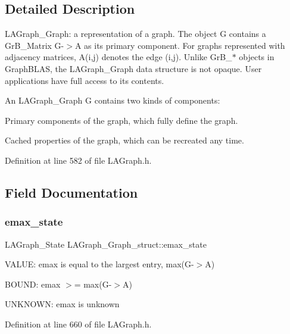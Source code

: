 \subsection{Detailed Description}
L\+A\+Graph\+\_\+\+Graph\+: a representation of a graph. The object G contains a Gr\+B\+\_\+\+Matrix G-\/$>$A as its primary component. For graphs represented with adjacency matrices, A(i,j) denotes the edge (i,j). Unlike Gr\+B\+\_\+$\ast$ objects in Graph\+B\+L\+AS, the L\+A\+Graph\+\_\+\+Graph data structure is not opaque. User applications have full access to its contents.

An L\+A\+Graph\+\_\+\+Graph G contains two kinds of components\+:
\begin{DoxyEnumerate}
\item Primary components of the graph, which fully define the graph.
\item Cached properties of the graph, which can be recreated any time. 
\end{DoxyEnumerate}

Definition at line 582 of file L\+A\+Graph.\+h.



\subsection{Field Documentation}
\mbox{\label{structLAGraph__Graph__struct_ad7bf05c8e88d308e233428d059c52111}} 
\subsubsection{\texorpdfstring{emax\+\_\+state}{emax\_state}}
{\footnotesize\ttfamily L\+A\+Graph\+\_\+\+State L\+A\+Graph\+\_\+\+Graph\+\_\+struct\+::emax\+\_\+state}


\begin{DoxyItemize}
\item V\+A\+L\+UE\+: emax is equal to the largest entry, max(G-\/$>$A)
\item B\+O\+U\+ND\+: emax $>$= max(G-\/$>$A)
\item U\+N\+K\+N\+O\+WN\+: emax is unknown 
\end{DoxyItemize}

Definition at line 660 of file L\+A\+Graph.\+h.

